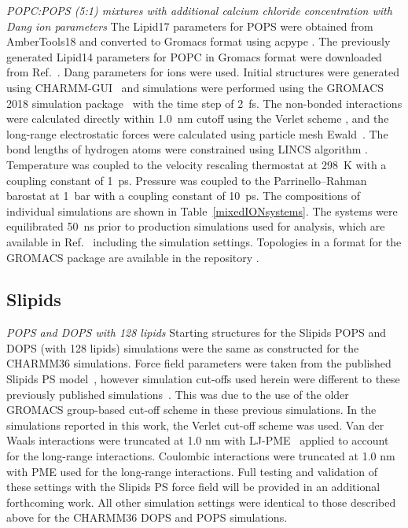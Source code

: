 \documentclass[journal=jpcbfk,manuscript=article]{achemso}
\newcommand{\todo}[1]{\textcolor{red}{#1}}
\begin{document}
\noindent
{\it POPC:POPS (5:1) mixtures with additional calcium chloride concentration with Dang ion parameters} 
The Lipid17 parameters for POPS were obtained from AmberTools18 \cite{amber18md} 
and converted to Gromacs format using acpype \cite{silva12}.  
The previously generated \cite{botan15} Lipid14 parameters for POPC in Gromacs format were downloaded from Ref.~. 
Dang parameters for ions \cite{smith94, dang06} were used.
Initial structures were generated using CHARMM-GUI~\cite{lee16,jo18} 
and simulations were performed using the GROMACS 2018 simulation package~\cite{abraham2015gromacs}
with the time step of 2~fs. 
The non-bonded interactions were calculated directly within 1.0~nm cutoff using the Verlet scheme \cite{Pall13}, 
and the long-range electrostatic forces were calculated using particle mesh Ewald~\cite{essman95}. 
The bond lengths of hydrogen atoms were constrained using LINCS algorithm \cite{hess97}.
Temperature was coupled to the velocity rescaling thermostat \cite{bussi07} at 298~K with a coupling constant of 1~ps.
Pressure was coupled to the Parrinello--Rahman barostat \cite{parrinello81} at 1~bar with a coupling constant of 10~ps. 
The compositions of individual simulations are shown in Table~\ref{mixedIONsystems}. 
The systems were equilibrated 50~ns prior to production simulations used for analysis,
which are available in Ref.~ including the simulation settings. 
Topologies in a format for the GROMACS package are available in the repository . 


\subsection{Slipids}
%
%
%
\noindent
{\it POPS and DOPS with 128 lipids}
Starting structures for the Slipids POPS and DOPS (with 128 lipids) simulations were the same as constructed
for the CHARMM36 simulations. Force field parameters were taken from the published Slipids PS model~\cite{jambeck13},
however simulation cut-offs used herein were different to these previously published simulations~\cite{jambeck2012another}.
This was due to the use of the older GROMACS group-based cut-off scheme in these previous simulations.
In the simulations reported in this work, the Verlet cut-off scheme was used. Van der Waals interactions were
truncated at 1.0 nm with LJ-PME~\cite{wennberg15}
applied to account for the long-range interactions.
Coulombic interactions were truncated at 1.0 nm with PME used for the long-range interactions.
Full testing and validation of these settings with the Slipids PS force field will be provided in an additional forthcoming work.
All other simulation settings were identical to those described above for the CHARMM36 DOPS and POPS simulations.
\end{document}

